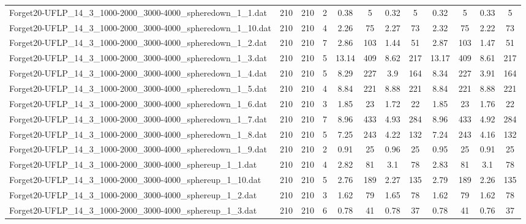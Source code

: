 \begin{sidewaystable}[!ht]
{\begin{tabular}{lccccccccccc}
Forget20-UFLP\_14\_3\_1000-2000\_3000-4000\_spheredown\_1\_1.dat & 210 & 210 & 2 & 0.38 & 5 &  \textcolor{blue2}{0.32} & 5 &  \textcolor{blue2}{0.32} & 5 & 0.33 & 5 \\
Forget20-UFLP\_14\_3\_1000-2000\_3000-4000\_spheredown\_1\_10.dat & 210 & 210 & 4 & 2.26 & 75 & 2.27 & 73 & 2.32 & 75 &  \textcolor{blue2}{2.22} & 73 \\
Forget20-UFLP\_14\_3\_1000-2000\_3000-4000\_spheredown\_1\_2.dat & 210 & 210 & 7 & 2.86 & 103 &  \textcolor{blue2}{1.44} & 51 & 2.87 & 103 & 1.47 & 51 \\
Forget20-UFLP\_14\_3\_1000-2000\_3000-4000\_spheredown\_1\_3.dat & 210 & 210 & 5 & 13.14 & 409 & 8.62 & 217 & 13.17 & 409 &  \textcolor{blue2}{8.61} & 217 \\
Forget20-UFLP\_14\_3\_1000-2000\_3000-4000\_spheredown\_1\_4.dat & 210 & 210 & 5 & 8.29 & 227 &  \textcolor{blue2}{3.9} & 164 & 8.34 & 227 & 3.91 & 164 \\
Forget20-UFLP\_14\_3\_1000-2000\_3000-4000\_spheredown\_1\_5.dat & 210 & 210 & 4 &  \textcolor{blue2}{8.84} & 221 & 8.88 & 221 &  \textcolor{blue2}{8.84} & 221 & 8.88 & 221 \\
Forget20-UFLP\_14\_3\_1000-2000\_3000-4000\_spheredown\_1\_6.dat & 210 & 210 & 3 & 1.85 & 23 &  \textcolor{blue2}{1.72} & 22 & 1.85 & 23 & 1.76 & 22 \\
Forget20-UFLP\_14\_3\_1000-2000\_3000-4000\_spheredown\_1\_7.dat & 210 & 210 & 7 & 8.96 & 433 & 4.93 & 284 & 8.96 & 433 &  \textcolor{blue2}{4.92} & 284 \\
Forget20-UFLP\_14\_3\_1000-2000\_3000-4000\_spheredown\_1\_8.dat & 210 & 210 & 5 & 7.25 & 243 & 4.22 & 132 & 7.24 & 243 &  \textcolor{blue2}{4.16} & 132 \\
Forget20-UFLP\_14\_3\_1000-2000\_3000-4000\_spheredown\_1\_9.dat & 210 & 210 & 2 & 0.91 & 25 & 0.96 & 25 & 0.95 & 25 & 0.91 & 25 \\
Forget20-UFLP\_14\_3\_1000-2000\_3000-4000\_sphereup\_1\_1.dat & 210 & 210 & 4 &  \textcolor{blue2}{2.82} & 81 & 3.1 & 78 & 2.83 & 81 & 3.1 & 78 \\
Forget20-UFLP\_14\_3\_1000-2000\_3000-4000\_sphereup\_1\_10.dat & 210 & 210 & 5 & 2.76 & 189 & 2.27 & 135 & 2.79 & 189 &  \textcolor{blue2}{2.26} & 135 \\
Forget20-UFLP\_14\_3\_1000-2000\_3000-4000\_sphereup\_1\_2.dat & 210 & 210 & 3 &  \textcolor{blue2}{1.62} & 79 & 1.65 & 78 &  \textcolor{blue2}{1.62} & 79 &  \textcolor{blue2}{1.62} & 78 \\
Forget20-UFLP\_14\_3\_1000-2000\_3000-4000\_sphereup\_1\_3.dat & 210 & 210 & 6 & 0.78 & 41 & 0.78 & 37 & 0.78 & 41 &  \textcolor{blue2}{0.76} & 37 \\

\end{tabular}}
\end{sidewaystable}
